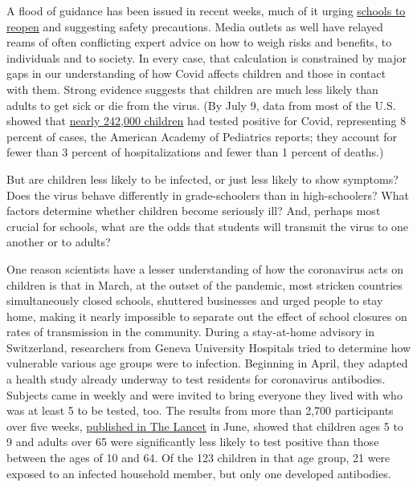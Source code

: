 A flood of guidance has been issued in recent weeks, much of it urging
\href{https://www.nytimes.com/2020/08/03/business/how-schools-reopen.html}{schools
to reopen} and suggesting safety precautions. Media outlets as well have
relayed reams of often conflicting expert advice on how to weigh risks
and benefits, to individuals and to society. In every case, that
calculation is constrained by major gaps in our understanding of how
Covid affects children and those in contact with them. Strong evidence
suggests that children are much less likely than adults to get sick or
die from the virus. (By July 9, data from most of the U.S. showed that
\href{https://services.aap.org/en/pages/2019-novel-coronavirus-covid-19-infections/children-and-covid-19-state-level-data-report/}{nearly
242,000 children} had tested positive for Covid, representing 8 percent
of cases, the American Academy of Pediatrics reports; they account for
fewer than 3 percent of hospitalizations and fewer than 1 percent of
deaths.)

But are children less likely to be infected, or just less likely to show
symptoms? Does the virus behave differently in grade-schoolers than in
high-schoolers? What factors determine whether children become seriously
ill? And, perhaps most crucial for schools, what are the odds that
students will transmit the virus to one another or to adults?

One reason scientists have a lesser understanding of how the coronavirus
acts on children is that in March, at the outset of the pandemic, most
stricken countries simultaneously closed schools, shuttered businesses
and urged people to stay home, making it nearly impossible to separate
out the effect of school closures on rates of transmission in the
community. During a stay-at-home advisory in Switzerland, researchers
from Geneva University Hospitals tried to determine how vulnerable
various age groups were to infection. Beginning in April, they adapted a
health study already underway to test residents for coronavirus
antibodies. Subjects came in weekly and were invited to bring everyone
they lived with who was at least 5 to be tested, too. The results from
more than 2,700 participants over five weeks,
\href{https://www.thelancet.com/journals/lancet/article/PIIS0140-6736(20)31304-0/fulltext}{published
in The Lancet} in June, showed that children ages 5 to 9 and adults over
65 were significantly less likely to test positive than those between
the ages of 10 and 64. Of the 123 children in that age group, 21 were
exposed to an infected household member, but only one developed
antibodies.

